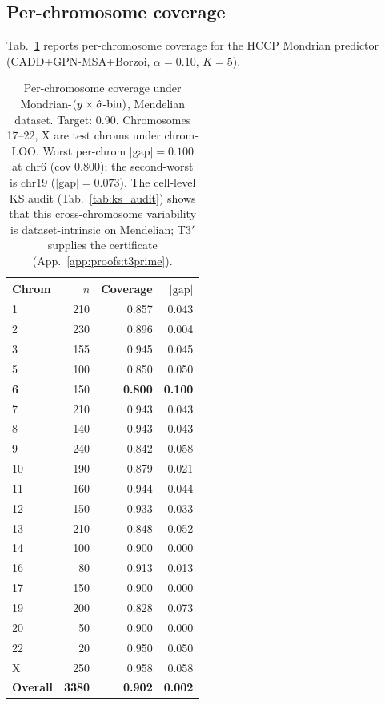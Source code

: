 \subsection{Per-chromosome coverage}
\label{app:tables:perchrom}

Tab.~\ref{tab:perchrom} reports per-chromosome coverage for the HCCP Mondrian predictor (CADD+GPN-MSA+Borzoi, $\alpha = 0.10$, $K = 5$).

\begin{table}[h]
\centering
\small
\caption{Per-chromosome coverage under Mondrian-$(y \times \hat{\sigma}\text{-bin})$, Mendelian dataset. Target: 0.90. Chromosomes 17--22, X are test chroms under chrom-LOO. Worst per-chrom $|\mathrm{gap}| = 0.100$ at chr6 (cov $0.800$); the second-worst is chr19 ($|\mathrm{gap}| = 0.073$). The cell-level KS audit (Tab.~\ref{tab:ks_audit}) shows that this cross-chromosome variability is dataset-intrinsic on Mendelian; T3$'$ supplies the certificate (App.~\ref{app:proofs:t3prime}).}
\label{tab:perchrom}
\begin{tabular}{lrrr}
\toprule
Chrom & $n$ & Coverage & $|\mathrm{gap}|$ \\
\midrule
1  & 210 & 0.857 & 0.043 \\
2  & 230 & 0.896 & 0.004 \\
3  & 155 & 0.945 & 0.045 \\
5  & 100 & 0.850 & 0.050 \\
\textbf{6}  & 150 & \textbf{0.800} & \textbf{0.100} \\
7  & 210 & 0.943 & 0.043 \\
8  & 140 & 0.943 & 0.043 \\
9  & 240 & 0.842 & 0.058 \\
10 & 190 & 0.879 & 0.021 \\
11 & 160 & 0.944 & 0.044 \\
12 & 150 & 0.933 & 0.033 \\
13 & 210 & 0.848 & 0.052 \\
14 & 100 & 0.900 & 0.000 \\
16 & 80  & 0.913 & 0.013 \\
17 & 150 & 0.900 & 0.000 \\
19 & 200 & 0.828 & 0.073 \\
20 & 50  & 0.900 & 0.000 \\
22 & 20  & 0.950 & 0.050 \\
X  & 250 & 0.958 & 0.058 \\
\midrule
\textbf{Overall} & \textbf{3380} & \textbf{0.902} & \textbf{0.002} \\
\bottomrule
\end{tabular}
\end{table}

